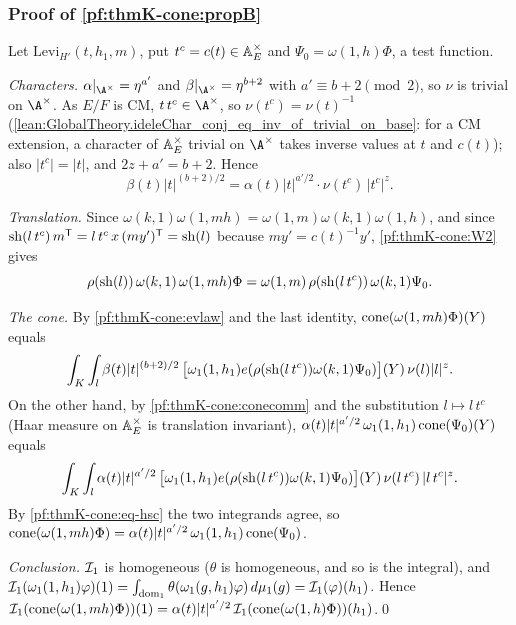 \subsubsection{Proof of \texorpdfstring{\cref{pf:thmK-cone:propB}}{the second proposition}}
Let $\mathrm{Levi}_{H'}(t,h_1,m)$, put $t^c=c(t)\in\mathbb{A}_E^\times$ and $\Psi_0=\omega(1,h)\Phi$, a test function.

\emph{Characters.}  $\alpha|_{\A^\times}=\eta^{a'}$ and $\beta|_{\A^\times}=\eta^{b+2}$ with $a'\equiv b+2\pmod 2$, so $\nu$ is
trivial on $\A^\times$.  As $E/F$ is CM, $t\,t^c\in\A^\times$, so $\nu(t^c)=\nu(t)^{-1}$
(\cref{lean:GlobalTheory.ideleChar_conj_eq_inv_of_trivial_on_base}: for a CM extension, a character of
$\mathbb{A}_E^\times$ trivial on $\A^\times$ takes inverse values at $t$ and $c(t)$); also $|t^c|=|t|$, and $2z+a'=b+2$.  Hence
\begin{equation}\label{pf:thmK-cone:eq-hsc}
  \beta(t)|t|^{(b+2)/2}=\alpha(t)|t|^{a'/2}\cdot\nu(t^c)\,|t^c|^z .
\end{equation}

\emph{Translation.}  Since $\omega(k,1)\omega(1,mh)=\omega(1,m)\omega(k,1)\omega(1,h)$, and since
$\operatorname{sh}(l\,t^c)\,m^{\mathsf T}=l\,t^c\,x\,(my')^{\mathsf T}=\operatorname{sh}(l)$ because $my'=c(t)^{-1}y'$,
\ref{pf:thmK-cone:W2} gives
\[
  \rho(\operatorname{sh}(l))\,\omega(k,1)\,\omega(1,mh)\Phi=\omega(1,m)\,\rho(\operatorname{sh}(l\,t^c))\,\omega(k,1)\Psi_0 .
\]

\emph{The cone.}  By \cref{pf:thmK-cone:evlaw} and the last identity, $\operatorname{cone}(\omega(1,mh)\Phi)(Y)$ equals
\[
  \int_K\int_l\beta(t)|t|^{(b+2)/2}\,\bigl[\omega_1(1,h_1)e(\rho(\operatorname{sh}(l\,t^c))\omega(k,1)\Psi_0)\bigr](Y)\,\nu(l)|l|^z .
\]
On the other hand, by \cref{pf:thmK-cone:conecomm} and the substitution $l\mapsto l\,t^c$ (Haar measure on
$\mathbb{A}_E^\times$ is translation invariant), $\alpha(t)|t|^{a'/2}\,\omega_1(1,h_1)\operatorname{cone}(\Psi_0)(Y)$ equals
\[
  \int_K\int_l\alpha(t)|t|^{a'/2}\,\bigl[\omega_1(1,h_1)e(\rho(\operatorname{sh}(l\,t^c))\omega(k,1)\Psi_0)\bigr](Y)\,
  \nu(l\,t^c)\,|l\,t^c|^z .
\]
By \eqref{pf:thmK-cone:eq-hsc} the two integrands agree, so
$\operatorname{cone}(\omega(1,mh)\Phi)=\alpha(t)|t|^{a'/2}\,\omega_1(1,h_1)\operatorname{cone}(\Psi_0)$.

\emph{Conclusion.}  $\mathcal{I}_1$ is homogeneous ($\theta$ is homogeneous, and so is the integral), and
$\mathcal{I}_1(\omega_1(1,h_1)\varphi)(1)=\int_{\mathrm{dom}_1}\theta(\omega_1(g,h_1)\varphi)\,d\mu_1(g)=\mathcal{I}_1(\varphi)(h_1)$.
Hence
$\mathcal{I}_1(\operatorname{cone}(\omega(1,mh)\Phi))(1)=\alpha(t)|t|^{a'/2}\,\mathcal{I}_1(\operatorname{cone}(\omega(1,h)\Phi))(h_1)$.\qed

